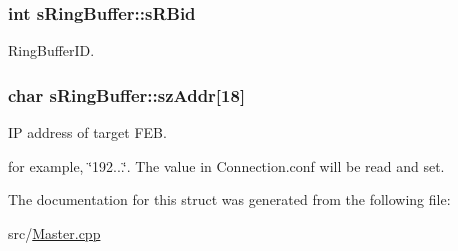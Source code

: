 \subsubsection[{\texorpdfstring{s\+R\+Bid}{sRBid}}]{\setlength{\rightskip}{0pt plus 5cm}int s\+Ring\+Buffer\+::s\+R\+Bid}\hypertarget{structsRingBuffer_a86973832a168fb3fb15847da4407e590}{}\label{structsRingBuffer_a86973832a168fb3fb15847da4407e590}


Ring\+Buffer\+ID. 

\subsubsection[{\texorpdfstring{sz\+Addr}{szAddr}}]{\setlength{\rightskip}{0pt plus 5cm}char s\+Ring\+Buffer\+::sz\+Addr\mbox{[}18\mbox{]}}\hypertarget{structsRingBuffer_a3d8b0121e3a6f4c1657581c5446e67cc}{}\label{structsRingBuffer_a3d8b0121e3a6f4c1657581c5446e67cc}


IP address of target F\+EB. 

for example, \char`\"{}192...\char`\"{}. The value in Connection.\+conf will be read and set. 

The documentation for this struct was generated from the following file\+:\begin{DoxyCompactItemize}
\item 
src/\hyperlink{Master_8cpp}{Master.\+cpp}\end{DoxyCompactItemize}
